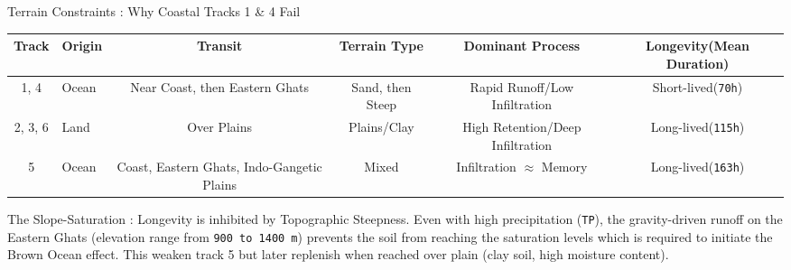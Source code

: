 \documentclass[8pt, aspectratio=169]{beamer}
\begin{document}
\begin{frame}[label=terrain]{Terrain Constraints : Why Coastal Tracks 1 \& 4 Fail}
    \vspace{0.05cm}
    \begin{table}
        \tiny
        \centering
        \begin{tabular}{clcccc}
            \toprule
            \textbf{Track} & \textbf{Origin} &  \textbf{Transit} & \textbf{Terrain Type} & \textbf{Dominant Process} & \textbf{Longevity(Mean Duration)} \\
            \midrule
            1, 4 & Ocean & Near Coast, then Eastern Ghats & Sand, then Steep & Rapid Runoff/Low Infiltration & Short-lived(\texttt{70h}) \\
            2, 3, 6 & Land &  Over Plains & Plains/Clay & High Retention/Deep Infiltration & Long-lived(\texttt{115h})\\
            5 & Ocean & Coast, Eastern Ghats, Indo-Gangetic Plains & Mixed & Infiltration $\approx$ Memory & Long-lived(\texttt{163h}) \\
            \bottomrule
        \end{tabular}
    \end{table}

    \begin{block}{\small The Slope-Saturation :}
        \footnotesize
        Longevity is inhibited by Topographic Steepness. Even with high precipitation (\texttt{TP}), the gravity-driven runoff on the Eastern Ghats (elevation range from \texttt{900 to 1400 m}) prevents the soil from reaching the saturation levels which is required to initiate the Brown Ocean effect. This weaken track 5 but later replenish when reached over plain (clay soil, high moisture content).
    \end{block}
\end{frame}
\end{document}
